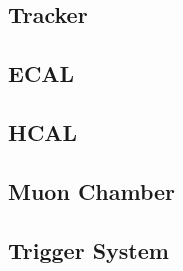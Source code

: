 \subsection{Tracker}
\subsection{ECAL}
\subsection{HCAL}
\subsection{Muon Chamber}
\subsection{Trigger System}
